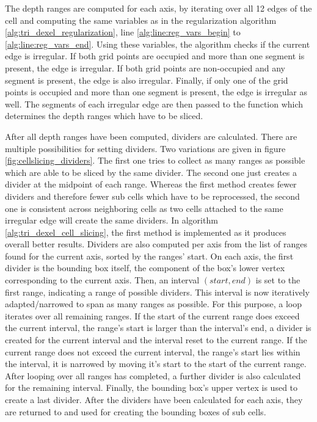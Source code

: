 The depth ranges are computed for each axis, by iterating over all 12 edges of the cell and computing the same variables as in the regularization algorithm \ref{alg:tri_dexel_regularization}, line \ref{alg:line:reg_vars_begin} to \ref{alg:line:reg_vars_end}.
Using these variables, the algorithm checks if the current edge is irregular.
If both grid points are occupied and more than one segment is present, the edge is irregular.
If both grid points are non-occupied and any segment is present, the edge is also irregular.
Finally, if only one of the grid points is occupied and more than one segment is present, the edge is irregular as well.
The segments of each irregular edge are then passed to the  function which determines the depth ranges which have to be sliced.

After all depth ranges have been computed, dividers are calculated.
There are multiple possibilities for setting dividers.
Two variations are given in figure \ref{fig:cellslicing_dividers}.
The first one tries to collect as many ranges as possible which are able to be sliced by the same divider.
The second one just creates a divider at the midpoint of each range.
Whereas the first method creates fewer dividers and therefore fewer sub cells which have to be reprocessed, the second one is consistent across neighboring cells as two cells attached to the same irregular edge will create the same dividers.
In algorithm \ref{alg:tri_dexel_cell_slicing}, the first method is implemented as it produces overall better results.
Dividers are also computed per axis from the list of ranges found for the current axis, sorted by the ranges' start.
On each axis, the first divider is the bounding box itself, \ie the component of the box's lower vertex corresponding to the current axis.
Then, an interval $(start, end)$ is set to the first range, indicating a range of possible dividers.
This interval is now iteratively adapted/narrowed to span as many ranges as possible.
For this purpose, a loop iterates over all remaining ranges.
If the start of the current range does exceed the current interval, \ie the range's start is larger than the interval's end, a divider is created for the current interval and the interval reset to the current range.
If the current range does not exceed the current interval, \ie the range's start lies within the interval, it is narrowed by moving it's start to the start of the current range.
After looping over all ranges has completed, a further divider is also calculated for the remaining interval.
Finally, the bounding box's upper vertex is used to create a last divider.
After the dividers have been calculated for each axis, they are returned to and used for creating the bounding boxes of sub cells.


